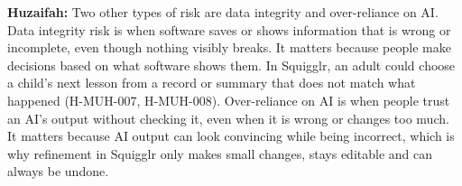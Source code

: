 \documentclass{article}
\begin{document}
\begin{enumerate}
\textbf{Huzaifah:} Two other types of risk are data integrity and over-reliance
on AI. Data integrity risk is when software saves or shows information that is
wrong or incomplete, even though nothing visibly breaks. It matters because
people make decisions based on what software shows them. In Squigglr, an adult
could choose a child's next lesson from a record or summary that does not match
what happened (H-MUH-007, H-MUH-008). Over-reliance on AI is when people trust
an AI's output without checking it, even when it is wrong or changes too much.
It matters because AI output can look convincing while being incorrect, which is
why refinement in Squigglr only makes small changes, stays editable and can
always be undone.

\end{enumerate}
\end{document}
